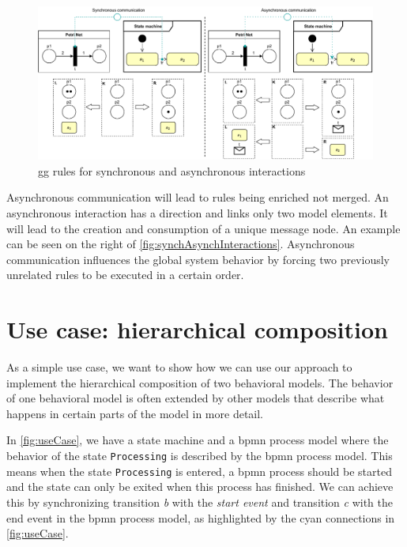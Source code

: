 \documentclass[a4paper]{easychair}
\begin{document}
\begin{figure}[h]
    \centering
    \includegraphics[width=1\textwidth]{images/synch_asynch.pdf}
    \caption{\gls{gg} rules for synchronous and asynchronous interactions}
    \label{fig:synchAsynchInteractions}
\end{figure}

Asynchronous communication will lead to rules being enriched not merged.
An asynchronous interaction has a direction and links only two model elements.
It will lead to the creation and consumption of a unique message node. 
An example can be seen on the right of \autoref{fig:synchAsynchInteractions}.
Asynchronous communication influences the global system behavior by forcing two previously unrelated rules to be executed in a certain order.




\section{Use case: hierarchical composition}
As a simple use case, we want to show how we can use our approach to implement the hierarchical composition of two behavioral models.
The behavior of one behavioral model is often extended by other models that describe what happens in certain parts of the model in more detail.

In \autoref{fig:useCase}, we have a state machine and a \gls{bpmn} process model where the behavior of the state \texttt{Processing} is described by the \gls{bpmn} process model.
This means when the state \texttt{Processing} is entered, a \gls{bpmn} process should be started and the state can only be exited when this process has finished.
We can achieve this by synchronizing transition \textit{b} with the \textit{start event} and transition \textit{c} with the end event in the \gls{bpmn} process model, as highlighted by the cyan connections in \autoref{fig:useCase}.
\end{document}
